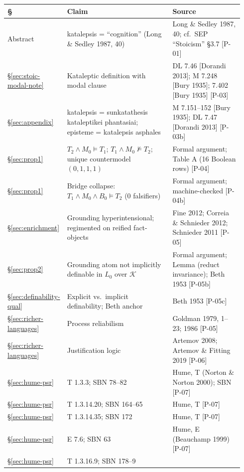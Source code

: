 \documentclass[11pt]{article}
\theoremstyle{plain}
\theoremstyle{definition}
\theoremstyle{remark}
\begin{document}
\begin{center}
\begin{longtable}{p{0.14\linewidth} p{0.48\linewidth} p{0.32\linewidth}}
\hline
\textbf{\S} & \textbf{Claim} & \textbf{Source} \\
\hline
Abstract &
katalepsis = ``cognition'' (Long \& Sedley 1987, 40) &
Long \& Sedley 1987, 40; cf.\ SEP ``Stoicism'' \S3.7 [P-01] \\
\hline
\S\ref{sec:stoic-modal-note} &
Kataleptic definition with modal clause &
DL 7.46 [Dorandi 2013]; M 7.248 [Bury 1935]; 7.402 [Bury 1935]
[P-03] \\
\hline
\S\ref{sec:appendix} &
katalepsis = sunkatathesis kataleptikei phantasiai; episteme =
katalepsis asphales &
M 7.151--152 [Bury 1935]; DL 7.47 [Dorandi 2013] [P-03b] \\
\hline
\S\ref{sec:prop1} &
$T_2\land M_0\models T_1$; $T_1\land M_0\not\models T_2$; unique
countermodel $(0,1,1,1)$ &
Formal argument; Table A (16 Boolean rows) [P-04] \\
\hline
\S\ref{sec:prop1} &
Bridge collapse: $T_1\land M_0\land B_0\models T_2$ (0 falsifiers) &
Formal argument; machine-checked [P-04b] \\
\hline
\S\ref{sec:enrichment} &
Grounding hyperintensional; regimented on reified fact-objects &
Fine 2012; Correia \& Schnieder 2012; Schnieder 2011 [P-05] \\
\hline
\S\ref{sec:prop2} &
Grounding atom not implicitly definable in $L_0$ over $\mathcal K$ &
Formal argument; Lemma (reduct invariance); Beth 1953 [P-05b] \\
\hline
\S\ref{sec:definability-qual} &
Explicit vs.\ implicit definability; Beth anchor& Beth 1953 [P-05c] \\
\hline
\S\ref{sec:richer-languages} &
Process reliabilism &
Goldman 1979, 1--23; 1986 [P-05] \\
\hline
\S\ref{sec:richer-languages} &
Justification logic &
Artemov 2008; Artemov \& Fitting 2019 [P-06] \\
\hline
\S\ref{sec:hume-psr} &
T 1.3.3; SBN 78--82 &
Hume, T (Norton \& Norton 2000); SBN [P-07] \\
\hline
\S\ref{sec:hume-psr} &
T 1.3.14.20; SBN 164--65 &
Hume, T [P-07] \\
\hline
\S\ref{sec:hume-psr} &
T 1.3.14.35; SBN 172 &
Hume, T [P-07] \\
\hline
\S\ref{sec:hume-psr} &
E 7.6; SBN 63 &
Hume, E (Beauchamp 1999) [P-07] \\
\hline
\S\ref{sec:hume-psr} &
T 1.3.16.9; SBN 178--9 &

\end{longtable}
\end{center}
\end{document}
